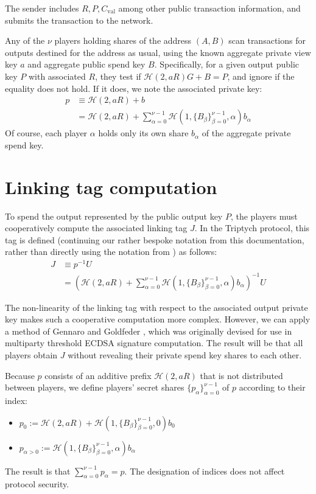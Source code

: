 \documentclass{article}
\newcommand{\hs}{\mathcal{H}}
\begin{document}
The sender includes $R, P, C_{\operatorname{val}}$ among other public transaction information, and submits the transaction to the network.

Any of the $\nu$ players holding shares of the address $(A,B)$ scan transactions for outputs destined for the address as usual, using the known aggregate private view key $a$ and aggregate public spend key $B$.
Specifically, for a given output public key $P$ with associated $R$, they test if $\hs(2,aR)G + B = P$, and ignore if the equality does not hold.
If it does, we note the associated private key:
\begin{align*}
p &\equiv \hs(2,aR) + b \\
&= \hs(2,aR) + \sum_{\alpha=0}^{\nu-1} \hs(1, \{B_\beta\}_{\beta=0}^{\nu-1}, \alpha) b_\alpha
\end{align*}
Of course, each player $\alpha$ holds only its own share $b_\alpha$ of the aggregate private spend key.


\section{Linking tag computation}

To spend the output represented by the public output key $P$, the players must cooperatively compute the associated linking tag $J$.
In the Triptych protocol, this tag is defined (continuing our rather bespoke notation from this documentation, rather than directly using the notation from \cite{triptych}) as follows:
\begin{align*}
J &\equiv p^{-1}U \\
&= \left( \hs(2,aR) + \sum_{\alpha=0}^{\nu-1} \hs(1, \{B_\beta\}_{\beta=0}^{\nu-1}, \alpha) b_\alpha \right)^{-1}U
\end{align*}

The non-linearity of the linking tag with respect to the associated output private key makes such a cooperative computation more complex.
However, we can apply a method of Gennaro and Goldfeder \cite{gennaro}, which was originally devised for use in multiparty threshold ECDSA signature computation.
The result will be that all players obtain $J$ without revealing their private spend key shares to each other.

Because $p$ consists of an additive prefix $\hs(2,aR)$ that is not distributed between players, we define players' secret shares $\{p_\alpha\}_{\alpha=0}^{\nu-1}$ of $p$ according to their index:
\begin{itemize}
    \item $p_0 := \hs(2,aR) + \hs(1, \{B_\beta\}_{\beta=0}^{\nu-1}, 0) b_0$
    \item $p_{\alpha > 0} := \hs(1, \{B_\beta\}_{\beta=0}^{\nu-1}, \alpha) b_\alpha$
\end{itemize}
The result is that $\sum_{\alpha=0}^{\nu-1} p_\alpha = p$.
The designation of indices does not affect protocol security.
\end{document}
